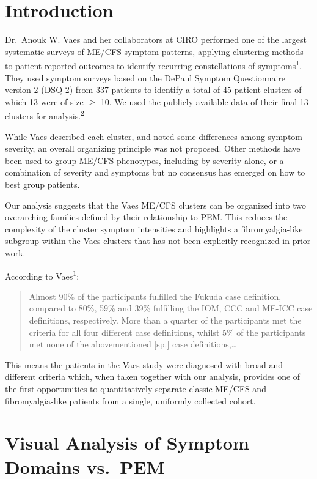 \documentclass[
  letterpaper,
  DIV=11,
  numbers=noendperiod]{scrartcl}
\begin{document}
\newpage{}

\section{Introduction}\label{introduction}

Dr.~Anouk W. Vaes and her collaborators at CIRO performed one of the
largest systematic surveys of ME/CFS symptom patterns, applying
clustering methods to patient-reported outcomes to identify recurring
constellations of symptoms\textsuperscript{1}. They used symptom surveys
based on the DePaul Symptom Questionnaire version 2 (DSQ-2) from 337
patients to identify a total of 45 patient clusters of which 13 were of
size \(\geq\) 10. We used the publicly available data of their final 13
clusters for analysis.\textsuperscript{2}

While Vaes described each cluster, and noted some differences among
symptom severity, an overall organizing principle was not proposed.
Other methods have been used to group ME/CFS phenotypes, including by
severity alone, or a combination of severity and symptoms but no
consensus has emerged on how to best group patients.

Our analysis suggests that the Vaes ME/CFS clusters can be organized
into two overarching families defined by their relationship to PEM. This
reduces the complexity of the cluster symptom intensities and highlights
a fibromyalgia-like subgroup within the Vaes clusters that has not been
explicitly recognized in prior work.

According to Vaes\textsuperscript{1}:

\begin{quote}
Almost 90\% of the participants fulfilled the Fukuda case definition,
compared to 80\%, 59\% and 39\% fulfilling the IOM, CCC and ME-ICC case
definitions, respectively. More than a quarter of the participants met
the criteria for all four different case definitions, whilst 5\% of the
participants met none of the abovementioned {[}sp.{]} case
definitions,\ldots{}
\end{quote}

This means the patients in the Vaes study were diagnosed with broad and
different criteria which, when taken together with our analysis,
provides one of the first opportunities to quantitatively separate
classic ME/CFS and fibromyalgia-like patients from a single, uniformly
collected cohort.

\section{Visual Analysis of Symptom Domains
vs.~PEM}\label{visual-analysis-of-symptom-domains-vs.-pem}
\end{document}
